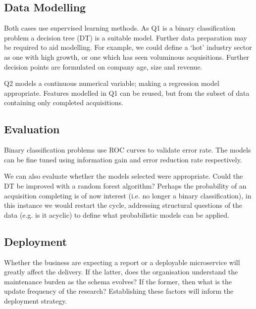 \documentclass[12pt]{article}
\begin{document}
 \subsection{Data Modelling}
Both cases use supervised learning methods. As Q1 is a binary classification problem a decision tree (DT) is a suitable model. Further data preparation may be required to aid modelling. For example, we could define a `hot' industry sector as one with high growth, or one which has seen voluminous acquisitions. Further decision points are formulated on company age, size and revenue.

 Q2 models a continuous numerical variable; making a regression model appropriate. Features modelled in Q1 can be reused, but from the subset of data containing only completed acquisitions.

 \subsection{Evaluation}
Binary classification problems use ROC curves to validate error rate. The models can be fine tuned using information gain and error reduction rate respectively.

We can also evaluate whether the models selected were appropriate. Could the DT be improved with a random forest algorithm? Perhaps the probability of an acquisition completing is of now interest (i.e. no longer a binary classification), in this instance we would restart the cycle, addressing structural questions of the data (e.g. is it acyclic) to define what probabilistic models can be applied.

\subsection{Deployment}
Whether the business are expecting a report or a deployable microservice will greatly affect the delivery. If the latter, does the organisation understand the maintenance burden as the schema evolves? If the former, then what is the update frequency of the research? Establishing these factors will inform the deployment strategy.
\end{document}
